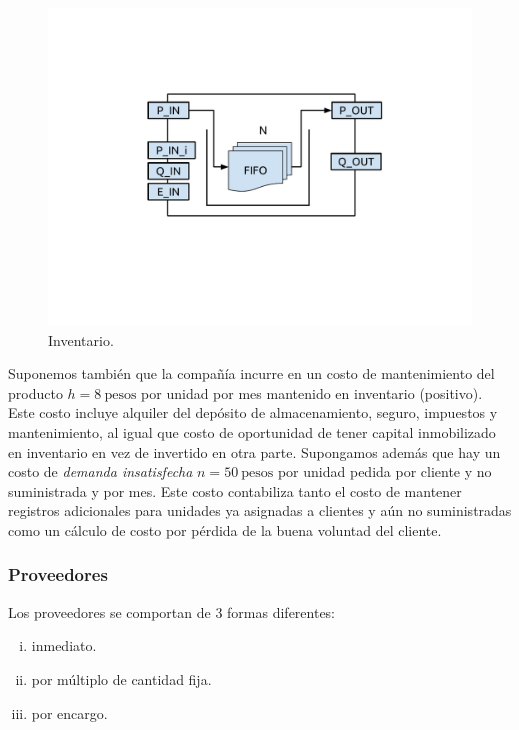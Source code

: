 \documentclass[10pt]{article}
\begin{document}
\begin{figure}
\centering
\includegraphics[scale=1]{img/figura7}
\caption{Inventario.}
\label{fig:fig7}
\end{figure}

Suponemos también que la compañía incurre en un costo de mantenimiento del producto $h = 8~\textrm{pesos}$ por unidad por mes mantenido en inventario (positivo). Este costo incluye alquiler del depósito de almacenamiento, seguro, impuestos y mantenimiento, al igual que costo de oportunidad de tener capital inmobilizado en inventario en vez de invertido en otra parte. Supongamos además que hay un costo de \textit{demanda insatisfecha} $n = 50~\textrm{pesos}$ por unidad pedida por cliente y no suministrada y por mes. Este costo contabiliza tanto el costo de mantener registros adicionales para unidades ya asignadas a clientes y aún no suministradas como un cálculo de costo por pérdida de la buena voluntad del cliente.


\subsubsection{Proveedores}

Los proveedores se comportan de 3 formas diferentes: 
\begin{enumerate}[i)]
\item inmediato.
\item por múltiplo de cantidad fija.
\item por encargo.
\end{enumerate}
\end{document}
